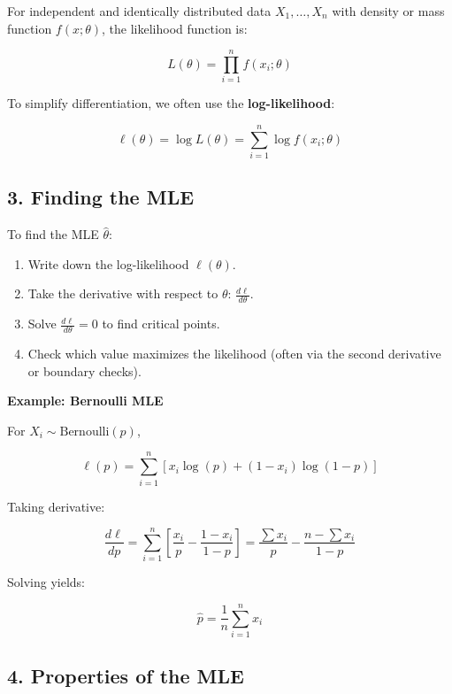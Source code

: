 \documentclass{book}
\begin{document}
For independent and identically distributed data $X_1, \dots, X_n$ with density or mass function $f(x; \theta)$, the likelihood function is:

\[
L(\theta) = \prod_{i=1}^{n} f(x_i; \theta)
\]

To simplify differentiation, we often use the \textbf{log-likelihood}:

\[
\ell(\theta) = \log L(\theta) = \sum_{i=1}^{n} \log f(x_i; \theta)
\]

\subsection{3. Finding the MLE}

To find the MLE $\hat{\theta}$:

\begin{enumerate}
    \item Write down the log-likelihood $\ell(\theta)$.
    \item Take the derivative with respect to $\theta$: $\frac{d\ell}{d\theta}$.
    \item Solve $\frac{d\ell}{d\theta} = 0$ to find critical points.
    \item Check which value maximizes the likelihood (often via the second derivative or boundary checks).
\end{enumerate}

\textbf{Example: Bernoulli MLE}

For $X_i \sim \text{Bernoulli}(p)$,

\[
\ell(p) = \sum_{i=1}^{n} \left[x_i \log(p) + (1 - x_i)\log(1 - p)\right]
\]

Taking derivative:

\[
\frac{d\ell}{dp} = \sum_{i=1}^{n} \left[\frac{x_i}{p} - \frac{1 - x_i}{1 - p}\right] = \frac{\sum x_i}{p} - \frac{n - \sum x_i}{1 - p}
\]

Solving yields:

\[
\hat{p} = \frac{1}{n} \sum_{i=1}^{n} x_i
\]

\subsection{4. Properties of the MLE}
\end{document}
